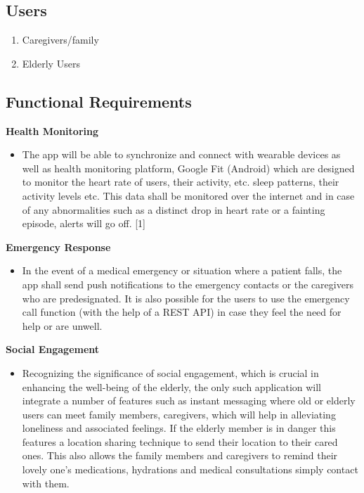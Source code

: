 \documentclass[a4paper, 12pt]{article}
\begin{document}
\subsection{Users}
\begin{enumerate}
    \item Caregivers/family
    \item Elderly Users
\end{enumerate}

\subsection{Functional Requirements}
\textbf{Health Monitoring }
\begin{itemize}
    \item The app will be able to synchronize and connect with wearable devices as well as health monitoring platform, Google Fit (Android) which are designed to monitor the heart rate of users, their activity, etc. sleep patterns, their activity levels etc. This data shall be monitored over the internet and in case of any abnormalities such as a distinct drop in heart rate or a fainting episode, alerts will go off. [1]
\end{itemize}
\textbf{Emergency Response}
\begin{itemize}
    \item In the event of a medical emergency or situation where a patient falls, the app shall send push notifications to the emergency contacts or the caregivers who are predesignated. It is also possible for the users to use the emergency call function (with the help of a REST API) in case they feel the need for help or are unwell.
\end{itemize}
\textbf{Social Engagement }
\begin{itemize}
    \item Recognizing the significance of social engagement, which is crucial in enhancing the well-being of the elderly, the only such application will integrate a number of features such as instant messaging where old or elderly users can meet family members, caregivers, which will help in alleviating loneliness and associated feelings. If the elderly member is in danger this features a location sharing technique to send their location to their cared ones. This also allows the family members and caregivers to remind their lovely one’s medications, hydrations and medical consultations simply contact with them.
\end{itemize}
\end{document}
